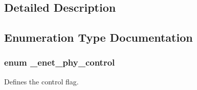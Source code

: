 \subsection{Detailed Description}


\subsection{Enumeration Type Documentation}
\subsubsection[{\texorpdfstring{\+\_\+enet\+\_\+phy\+\_\+control}{_enet_phy_control}}]{\setlength{\rightskip}{0pt plus 5cm}enum {\bf \+\_\+enet\+\_\+phy\+\_\+control}}\hypertarget{group__phy__driver_ga6a73ce8fecc8d411b87534a1c598f45b}{}\label{group__phy__driver_ga6a73ce8fecc8d411b87534a1c598f45b}


Defines the control flag. 

